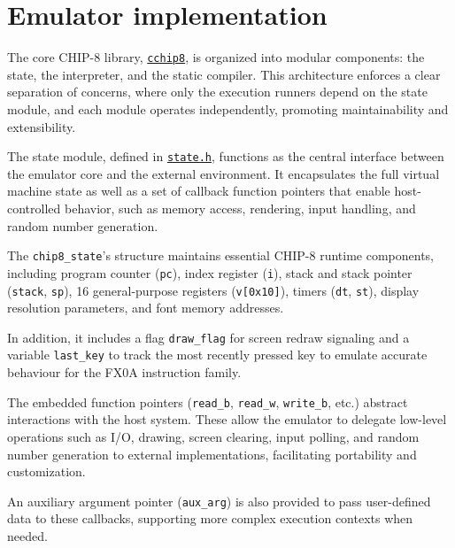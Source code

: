 \section{Emulator implementation}
\label{sec:ch3sec3}

\par The core CHIP-8 library, \href{https://github.com/solomonarul/cchip8}{\texttt{cchip8}}, is organized into modular components: the state, the interpreter, and the static compiler. This architecture enforces a clear separation of concerns, where only the execution runners depend on the state module, and each module operates independently, promoting maintainability and extensibility.

\par The state module, defined in \href{https://github.com/solomonarul/cchip8/blob/main/inc/cchip8/state.h}{\texttt{state.h}}, functions as the central interface between the emulator core and the external environment. It encapsulates the full virtual machine state as well as a set of callback function pointers that enable host-controlled behavior, such as memory access, rendering, input handling, and random number generation.

\par The \texttt{chip8\_state}'s structure maintains essential CHIP-8 runtime components, including program counter (\texttt{pc}), index register (\texttt{i}), stack and stack pointer (\texttt{stack}, \texttt{sp}), 16 general-purpose registers (\texttt{v[0x10]}), timers (\texttt{dt}, \texttt{st}), display resolution parameters, and font memory addresses.

\par In addition, it includes a flag \texttt{draw\_flag} for screen redraw signaling and a variable \texttt{last\_key} to track the most recently pressed key to emulate accurate behaviour for the FX0A instruction family.

\par The embedded function pointers (\texttt{read\_b}, \texttt{read\_w}, \texttt{write\_b}, etc.) abstract interactions with the host system. These allow the emulator to delegate low-level operations such as I/O, drawing, screen clearing, input polling, and random number generation to external implementations, facilitating portability and customization.

\par An auxiliary argument pointer (\texttt{aux\_arg}) is also provided to pass user-defined data to these callbacks, supporting more complex execution contexts when needed.

